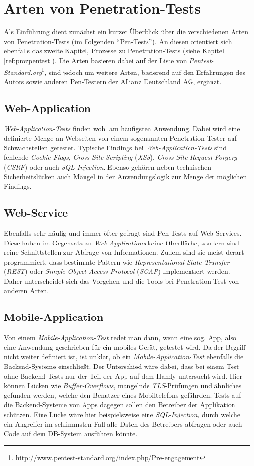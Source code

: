 \chapter{Arten von Penetration-Tests}
Als Einführung dient zunächst ein kurzer Überblick über die verschiedenen Arten von Penetration-Tests (im Folgenden "`Pen-Tests"'). An diesen orientiert sich ebenfalls das zweite Kapitel, Prozesse zu Penetration-Tests (siehe Kapitel \ref{ref:prozpentest}). Die Arten basieren dabei auf der Liste von \textit{Pentest-Standard.org}\footnote{\url{http://www.pentest-standard.org/index.php/Pre-engagement}}, sind jedoch um weitere Arten, basierend auf den Erfahrungen des Autors sowie anderen Pen-Testern der Allianz Deutschland AG, ergänzt.

	\section{Web-Application}
	\textit{Web-Application-Tests} finden wohl am häufigsten Anwendung. Dabei wird eine definierte Menge an Webseiten von einem sogenannten Penetration-Tester auf Schwachstellen getestet. Typische Findings bei \textit{Web-Application-Tests} sind fehlende \textit{Cookie-Flags}, \textit{Cross-Site-Scripting} (\textit{XSS}), \textit{Cross-Site-Request-Forgery} (\textit{CSRF}) oder auch \textit{SQL-Injection}. Ebenso gehören neben technischen Sicherheitslücken auch Mängel in der Anwendungslogik zur Menge der möglichen Findings.
	
	\section{Web-Service}
	Ebenfalls sehr häufig und immer öfter gefragt sind Pen-Tests auf Web-Services. Diese haben im Gegensatz zu \textit{Web-Applications} keine Oberfläche, sondern sind reine Schnittstellen zur Abfrage von Informationen. Zudem sind sie meist derart programmiert, dass bestimmte Pattern wie \textit{Representational State Transfer} (\textit{REST}) oder \textit{Simple Object Access Protocol} (\textit{SOAP}) implementiert werden. Daher unterscheidet sich das Vorgehen und die Tools bei Penetration-Test von anderen Arten.
	
	\section{Mobile-Application}
	Von einem \textit{Mobile-Application-Test} redet man dann, wenn eine sog. App, also eine Anwendung geschrieben für ein mobiles Gerät, getestet wird. Da der Begriff nicht weiter definiert ist, ist unklar, ob ein \textit{Mobile-Application-Test} ebenfalls die Backend-Systeme einschließt. Der Unterschied wäre dabei, dass bei einem Test ohne Backend-Tests nur der Teil der App auf dem Handy untersucht wird. Hier können Lücken wie \textit{Buffer-Overflows}, mangelnde \textit{TLS}-Prüfungen und ähnliches gefunden werden, welche den Benutzer eines Mobiltelefons gefährden. Tests auf die Backend-Systeme von Apps dagegen sollen den Betreiber der Applikation schützen. Eine Lücke wäre hier beispielsweise eine \textit{SQL-Injection}, durch welche ein Angreifer im schlimmsten Fall alle Daten des Betreibers abfragen oder auch Code auf dem DB-System ausführen könnte.
	
